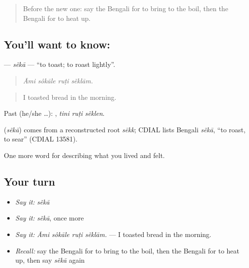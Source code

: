 \label{lesson:BN-C514-seka}



\begin{quote}
Before the new one: say the Bengali for to bring to the boil, then the Bengali for to heat up.
\end{quote}

\subsection*{You'll want to know: }
\textbf{} — \emph{sẽkā} — \textquotedblleft{}to toast; to roast lightly\textquotedblright{}.

\begin{quote}
   
\end{quote}

\begin{quote}
\emph{Āmi sôkāle ruṭi sẽklām.}
\end{quote}

\begin{quote}
I toasted bread in the morning.
\end{quote}

Past (he/she …):   , \emph{tini ruṭi sẽklen}.

\begin{cousinweb}
\textbf{} (\emph{sẽkā}) comes from a reconstructed root \emph{sēkk}; CDIAL lists Bengali \emph{sẽkā}, \textquotedblleft{}to roast, to sear\textquotedblright{} (CDIAL 13581).
\end{cousinweb}

\begin{grammarlens}[title={What you've built}]
One more word for describing what you lived and felt.
\end{grammarlens}

\subsection*{Your turn}
\begin{itemize}
\raggedright
  \item \emph{Say it:} \emph{sẽkā}
  \item \emph{Say it:} \emph{sẽkā}, once more
  \item \emph{Say it:} \emph{Āmi sôkāle ruṭi sẽklām.} — I toasted bread in the morning.
  \item \emph{Recall:} say the Bengali for to bring to the boil, then the Bengali for to heat up, then say \emph{sẽkā} again
\end{itemize}

